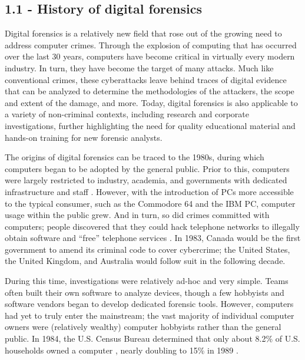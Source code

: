 \subsection{1.1 - History of digital
forensics}\label{history-of-digital-forensics}

Digital forensics is a relatively new field that rose out of the growing
need to address computer crimes. Through the explosion of computing that
has occurred over the last 30 years, computers have become critical in
virtually every modern industry. In turn, they have become the target of
many attacks. Much like conventional crimes, these cyberattacks leave
behind traces of digital evidence that can be analyzed to determine the
methodologies of the attackers, the scope and extent of the damage, and
more. Today, digital forensics is also applicable to a variety of
non-criminal contexts, including research and corporate investigations,
further highlighting the need for quality educational material and
hands-on training for new forensic analysts.

The origins of digital forensics can be traced to the 1980s, during
which computers began to be adopted by the general public. Prior to
this, computers were largely restricted to industry, academia, and
governments with dedicated infrastructure and staff
\cite{pollittHistoryDigitalForensics2010}. However, with the
introduction of PCs more accessible to the typical consumer, such as the
Commodore 64 and the IBM PC, computer usage within the public grew. And
in turn, so did crimes committed with computers; people discovered that
they could hack telephone networks to illegally obtain software and
``free'' telephone services \cite{jonesInsightDigitalForensics2022}.
In 1983, Canada would be the first government to amend its criminal code
to cover cybercrime; the United States, the United Kingdom, and
Australia would follow suit in the following decade.

During this time, investigations were relatively ad-hoc and very simple.
Teams often built their own software to analyze devices, though a few
hobbyists and software vendors began to develop dedicated forensic
tools. However, computers had yet to truly enter the mainstream; the
vast majority of individual computer owners were (relatively wealthy)
computer hobbyists rather than the general public. In 1984, the U.S.
Census Bureau determined that only about 8.2\% of U.S. households owned
a computer \cite{robertkominskiComputerUseUnited1988}, nearly
doubling to 15\% in 1989 \cite{robertkominskiComputerUseUnited1991}.

